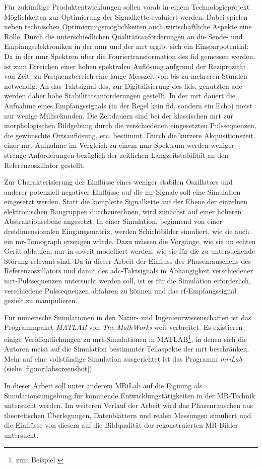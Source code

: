 Für zukünftige Produktentwicklungen sollen vorab in einem Technologie\-projekt Möglich\-keiten zur Optimierung der Signalkette evaluiert werden. Dabei spielen neben technischen Optimierungsmöglichkeiten auch wirtschaftliche Aspekte eine Rolle.
Durch die unterschiedlichen Qualitätsanforderungen an die Sende- und Empfangselektroniken in der \gls{nmr} und der \gls{mrt} ergibt sich ein Einsparpotential: Da in der \gls{nmr} Spektren über die Fouriertransformation des \gls{fid} gemessen werden, ist zum Erreichen einer hohen spektralen Auflösung aufgrund der Reziprozität von Zeit- zu Frequenzbereich eine lange Messzeit von bis zu mehreren Stunden notwendig. An das Taktsignal des, zur Digitalisierung des \gls{fid}s, genutzten \gls{adc} werden daher hohe Stabilitätsanforderungen gestellt. In der \gls{mrt} dauert die Aufnahme eines Empfangssignals (in der Regel kein \gls{fid}, sondern ein Echo) meist nur wenige Millisekunden. Die Zeitdauern sind bei der klassischen \gls{mrt} zur morphologischen Bildgebung durch die verschiedenen eingesetzten Pulssequenzen, die gewünschte Ortsauflösung, etc. bestimmt.
Durch die kürzere Akquisitionszeit einer \gls{mrt}-Aufnahme im Vergleich zu einem \gls{nmr}-Spektrum werden weniger strenge Anforderungen bezüglich der zeitlichen Langzeitstabilität an den Referenzoszillator gestellt.

Zur Charakterisierung der Einflüsse eines weniger stabilen Oszillators und anderer potenziell negativer Einflüsse auf die \gls{mr}-Signale soll eine Simulation eingesetzt werden. Statt die komplette Signalkette auf der Ebene der einzelnen elektronischen Baugruppen durchzurechnen, wird zunächst auf einer höheren Abstraktionsebene angesetzt. In einer Simulation, beginnend von einer dreidimensionalen Eingangsmatrix, werden Schichtbilder simuliert, wie sie auch ein \gls{mr}-Tomograph erzeugen würde. Dazu müssen die Vorgänge, wie sie im echten Gerät ablaufen, nur in soweit modelliert werden, wie sie für die zu untersuchende Störung relevant sind. Da in dieser Arbeit der Einfluss des Phasenrauschens des Referenzoszillators und damit des \gls{adc}-Taktsignals in Abhängigkeit verschiedener \gls{mrt}-Pulssequenzen untersucht werden soll, ist es für die Simulation erforderlich, verschiedene Pulssequenzen abfahren zu können und das \gls{rf}-Empfangssignal gezielt zu manipulieren.

Für numerische Simulationen in den Natur- und Ingenieurwissenschaften ist das Programmpaket \textit{MATLAB}\cite{matlab} von \textit{The MathWorks} weit verbreitet. Es existieren einige Ver\-öffent\-lichungen zu \gls{mrt}-Simulationen in MATLAB\footnote{zum Beispiel \cite{Kern2012}}, in denen sich die Autoren meist auf die Simulation bestimmter Teilaspekte der \gls{mrt} beschränken. Mehr auf eine vollständige Simulation ausgerichtet ist das Programm \textit{\gls{mr}iLab}\cite{Liu2017} (siehe \autoref{fig:mrilabscreenshot}).

In dieser Arbeit soll unter anderem MRiLab auf die Eignung als Simulationsumgebung für kommende Entwicklungstätigkeiten in der MR-Technik untersucht werden. Im weiteren Verlauf der Arbeit wird das Phasenrauschen aus theoretischen Überlegungen, Datenblättern und realen Messungen simuliert und die Einflüsse von diesem auf die Bildqualität der rekonstruierten MR-Bilder untersucht.


